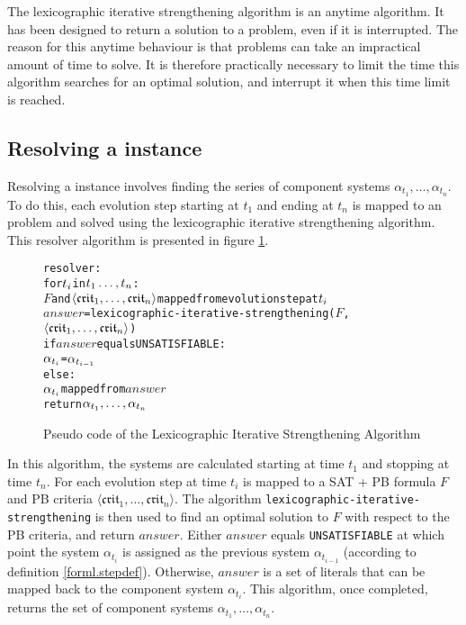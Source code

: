 The lexicographic iterative strengthening algorithm is an anytime algorithm.
It has been designed to return a solution to a \modelimpl problem, even if it is interrupted.
The reason for this anytime behaviour is that \modelimpl problems can take an impractical amount of time to solve.
It is therefore practically necessary to limit the time this algorithm searches for an optimal solution, 
and interrupt it when this time limit is reached. 

\subsection{Resolving a \modelname instance}
Resolving a \modelname instance involves finding the series of component systems $\alpha_{t_1},\ldots,\alpha_{t_n}$.
To do this, each evolution step starting at $t_1$ and ending at $t_n$ is mapped to an \modelimpl problem and solved using the lexicographic iterative strengthening algorithm.
This resolver algorithm is presented in figure \ref{impl.resolver}.
\begin{figure}[h!t!]
\begin{center}
\begin{alltt}
resolver:  
    for \(t\sb{i}\) in \(t\sb{1}\ldots,t\sb{n}\):
        \(F\) and \(\langle{}\mathfrak{crit}\sb{1}, \ldots ,\mathfrak{crit}\sb{n}\rangle\) mapped from evolution step at \(t\sb{i}\)
        \(answer\) = lexicographic-iterative-strengthening(\(F\),\(\langle{}\mathfrak{crit}\sb{1}, \ldots ,\mathfrak{crit}\sb{n}\rangle\))
        if \(answer\) equals UNSATISFIABLE:
            \(\alpha\sb{t\sb{i}}\) = \(\alpha\sb{t\sb{i-1}}\)
        else:
            \(\alpha\sb{t\sb{i}}\) mapped from \(answer\)
    return \(\alpha\sb{t\sb{1}},\ldots,\alpha\sb{t\sb{n}}\) 
\end{alltt}
  \caption{Pseudo code of the Lexicographic Iterative Strengthening Algorithm}
  \label{impl.resolver}
\end{center}
\end{figure}

In this algorithm, the systems are calculated starting at time $t_1$ and stopping at time $t_n$.
For each evolution step at time $t_i$ is mapped to a SAT + PB formula $F$ and PB criteria $\langle \mathfrak{crit}_{1}, \ldots ,\mathfrak{crit}_{n} \rangle$.
The algorithm \texttt{lexicographic-iterative-strengthening} is then used to find an optimal solution to $F$ with respect to the PB criteria, and return $answer$.
Either $answer$ equals \texttt{UNSATISFIABLE} at which point the system $\alpha_{t_i}$ is assigned as the previous system $\alpha_{t_{i-1}}$ (according to definition \ref{forml.stepdef}).
Otherwise, $answer$ is a set of literals that can be mapped back to the component system $\alpha_{t_i}$.
This algorithm, once completed, returns the set of component systems $\alpha_{t_1},\ldots,\alpha_{t_n}$.

